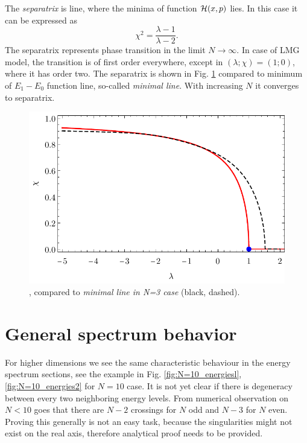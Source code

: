 The \emph{separatrix} is line, where the minima of function $\mathcal{H}(x,p)$ lies. In this case it can be expressed as
\begin{equation}
    \chi^2=\frac{\lambda-1}{\lambda-2}.
    \label{eq:separatrix}
\end{equation}
The separatrix represents phase transition in the limit $N\rightarrow \infty$. In case of LMG model, the transition is of first order everywhere, except in $(\lambda;\chi)=(1;0)$, where it has order two. The separatrix is shown in Fig. \ref{fig:transitionCompare} compared to minimum of $E_1-E_0$ function line, so-called \emph{minimal line}. With increasing $N$ it converges to separatrix.

\begin{figure}[H]
    \centering
    \includegraphics{../img/infiniteN_transitionCompare.pdf}
    \caption{,  compared to \emph{minimal line in N=3 case} (black, dashed).}
    \label{fig:transitionCompare}    
\end{figure}












\section{General spectrum behavior}
For higher dimensions we see the same characteristic behaviour in the energy spectrum sections, see the example in Fig. \ref{fig:N=10_energiesl}, \ref{fig:N=10_energies2} for $N=10$ case. It is not yet clear if there is degeneracy between every two neighboring energy levels. From numerical observation on $N<10$ goes that there are $N-2$ crossings for $N$ odd and $N-3$ for $N$ even. Proving this generally is not an easy task, because the singularities might not exist on the real axis, therefore analytical proof needs to be provided.


